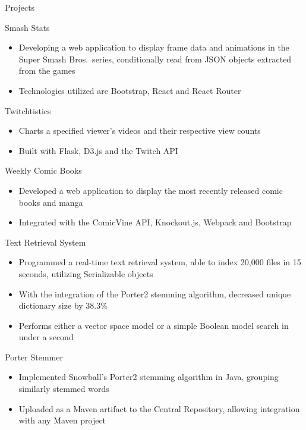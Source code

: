 \documentclass[]{xjavathehutt}
\begin{document}
\begin{cvsection}{Projects}
  \begin{cvsubsection}{Smash Stats}{}{}
    \begin{itemize}
      \item{Developing a web application to display frame data and animations in the Super Smash Bros.\ series, conditionally read from JSON objects extracted from the games}
      \item{Technologies utilized are Bootstrap, React and React Router}
    \end{itemize}
  \end{cvsubsection}

  \begin{cvsubsection}{Twitchtistics}{}{}
    \begin{itemize}
      \item{Charts a specified viewer's videos and their respective view counts}
      \item{Built with Flask, D3.js and the Twitch API}
    \end{itemize}
  \end{cvsubsection}
  
  \begin{cvsubsection}{Weekly Comic Books}{}{}
    \begin{itemize}
      \item{Developed a web application to display the most recently released comic books and manga}
      \item{Integrated with the ComicVine API, Knockout.js, Webpack and Bootstrap}
    \end{itemize}
  \end{cvsubsection}

  \begin{cvsubsection}{Text Retrieval System}{}{}
    \begin{itemize}
      \item{Programmed a real-time text retrieval system, able to index 20,000 files in 15 seconds, utilizing Serializable objects}
      \item{With the integration of the Porter2 stemming algorithm, decreased unique dictionary size by 38.3\%}
      \item{Performs either a vector space model or a simple Boolean model search in under a second}
    \end{itemize}
  \end{cvsubsection}

  \begin{cvsubsection}{Porter Stemmer}{}{}
    \begin{itemize}
      \item{Implemented Snowball's Porter2 stemming algorithm in Java, grouping similarly stemmed words}
      \item{Uploaded as a Maven artifact to the Central Repository, allowing integration with any Maven project}
    \end{itemize}
    \end{cvsubsection}
  \end{cvsection}
\end{document}
